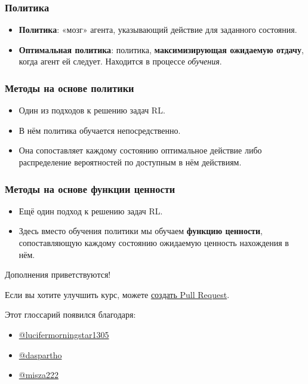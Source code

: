 \documentclass[11pt,a4paper]{article}
\begin{document}
\subsubsection{Политика}\label{policy}

\begin{itemize}
\tightlist
\item
  \textbf{Политика}: «мозг» агента, указывающий действие для заданного состояния.
\item
  \textbf{Оптимальная политика}: политика, \textbf{максимизирующая ожидаемую отдачу}, когда агент ей следует. Находится в процессе \emph{обучения}.
\end{itemize}

\subsubsection{Методы на основе политики}\label{policy-based-methods-1}

\begin{itemize}
\tightlist
\item
  Один из подходов к решению задач RL.
\item
  В нём политика обучается непосредственно.
\item
  Она сопоставляет каждому состоянию оптимальное действие либо распределение вероятностей по доступным в нём действиям.
\end{itemize}

\subsubsection{Методы на основе функции ценности}\label{value-based-methods-1}

\begin{itemize}
\tightlist
\item
  Ещё один подход к решению задач RL.
\item
  Здесь вместо обучения политики мы обучаем \textbf{функцию ценности}, сопоставляющую каждому состоянию ожидаемую ценность нахождения в нём.
\end{itemize}

Дополнения приветствуются!

Если вы хотите улучшить курс, можете \href{https://github.com/huggingface/deep-rl-class/pulls}{создать Pull Request}.

Этот глоссарий появился благодаря:

\begin{itemize}
\tightlist
\item
  \href{https://github.com/lucifermorningstar1305}{@lucifermorningstar1305}
\item
  \href{https://github.com/daspartho}{@daspartho}
\item
  \href{https://github.com/misza222}{@misza222}
\end{itemize}
\end{document}
